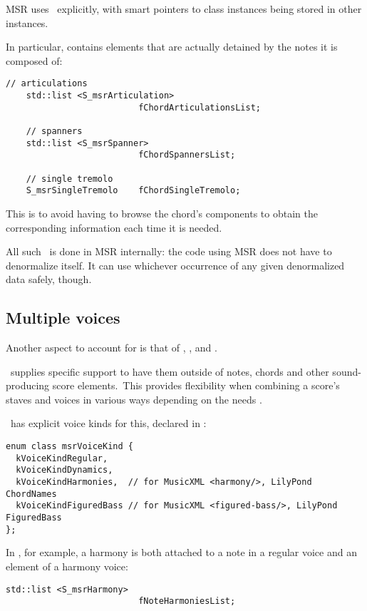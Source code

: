 MSR uses \denorm\ explicitly, with smart pointers to class instances being stored in other instances.

In particular,  contains elements that are actually detained by the notes it is composed of:
\begin{lstlisting}[language=CPlusPlus]
    // articulations
    std::list <S_msrArticulation>
                          fChordArticulationsList;

    // spanners
    std::list <S_msrSpanner>
                          fChordSpannersList;

    // single tremolo
    S_msrSingleTremolo    fChordSingleTremolo;
\end{lstlisting}

This is to avoid having to browse the chord's components to obtain the corresponding information each time it is needed.

All such \denorm\ is done in MSR internally: the code using MSR does not have to denormalize itself.
It can use whichever occurrence of any given denormalized data safely, though.


\subsection{Multiple voices}

Another aspect to account for is that of , ,  and .

\lily\ supplies specific support to have them outside of notes, chords and other sound-producing score elements.\
This provides flexibility when combining a score's staves and voices in various ways depending on the needs .

\mf\ has explicit voice kinds for this, declared in :
\begin{lstlisting}[language=CPlusPlus]
enum class msrVoiceKind {
  kVoiceKindRegular,
  kVoiceKindDynamics,
  kVoiceKindHarmonies,  // for MusicXML <harmony/>, LilyPond ChordNames
  kVoiceKindFiguredBass // for MusicXML <figured-bass/>, LilyPond FiguredBass
};
\end{lstlisting}

In \msrRepr, for example, a harmony is both attached to a note in a regular voice and an element of a harmony voice:
\begin{lstlisting}[language=CPlusPlus]
    std::list <S_msrHarmony>
                          fNoteHarmoniesList;
\end{lstlisting}

